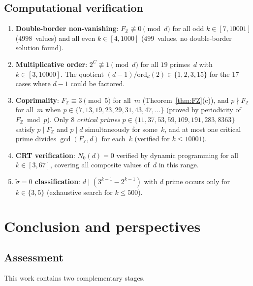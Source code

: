 \documentclass[12pt, a4paper]{amsart}
\theoremstyle{plain}
\theoremstyle{definition}
\theoremstyle{remark}
\newcommand{\Z}{\mathbb{Z}}
\newcommand{\ord}{\mathrm{ord}}
\begin{document}
\subsection{Computational verification}%
\label{ssec:blocking-computations}

\begin{enumerate}[label=\textup{(V\arabic*)}]
  \item \textbf{Double-border non-vanishing}:
    $F_\Z \not\equiv 0 \pmod{d}$ for all odd
    $k \in [7, 10001]$ ($4998$~values) and all even
    $k \in [4, 1000]$ ($499$~values, no double-border
    solution found).
  \item \textbf{Multiplicative order}:
    $2^C \not\equiv 1 \pmod{d}$ for all $19$ primes~$d$
    with $k \in [3, 10000]$.
    The quotient $(d-1)/\ord_d(2) \in \{1, 2, 3, 15\}$
    for the $17$ cases where $d - 1$ could be factored.
  \item \textbf{Coprimality}:
    $F_\Z \equiv 3 \pmod{5}$ for all~$m$
    (Theorem~\ref{thm:FZ}(c)), and $p \nmid F_\Z$ for
    all~$m$ when
    $p \in \{7, 13, 19, 23, 29, 31, 43, 47, \ldots\}$
    (proved by periodicity of $F_\Z \bmod p$).
    Only $8$ \emph{critical primes}
    $p \in \{11, 37, 53, 59, 109, 191, 283, 8363\}$
    satisfy $p \mid F_\Z$ and $p \mid d$ simultaneously
    for some~$k$, and at most one critical prime divides
    $\gcd(F_\Z, d)$ for each~$k$ (verified for
    $k \leq 10001$).
  \item \textbf{CRT verification}:
    $N_0(d) = 0$ verified by dynamic programming
    for all $k \in [3, 67]$, covering all composite
    values of~$d$ in this range.
  \item \textbf{$\tilde\sigma = 0$ classification}:
    $d \mid (3^{k-1} - 2^{k-1})$ with $d$ prime
    occurs only for $k \in \{3, 5\}$
    (exhaustive search for $k \leq 500$).
\end{enumerate}

\section{Conclusion and perspectives}\label{sec:conclusion}

\subsection{Assessment}

This work contains two complementary stages.
\end{document}
